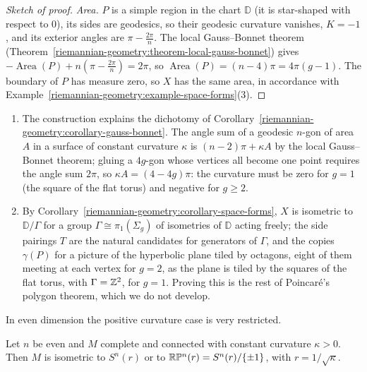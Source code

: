 \begin{proof}[Sketch of proof]
\emph{Area.} $P$ is a simple region in the chart $\mathbb{D}$ (it is star-shaped with respect to $0$), its sides are geodesics, so their geodesic curvature vanishes, $K = -1$, and its exterior angles are
$\pi - \frac{2\pi}{n}$. The local Gauss--Bonnet theorem (Theorem~\ref{riemannian-geometry:theorem-local-gauss-bonnet}) gives $-\operatorname{Area}(P) + n(\pi - \frac{2\pi}{n}) = 2\pi$, so
$\operatorname{Area}(P) = (n - 4)\pi = 4\pi(g - 1)$. The boundary of $P$ has measure zero, so $X$ has the same area, in accordance with Example~\ref{riemannian-geometry:example-space-forms}(3).
\end{proof}

\begin{remark}\label{riemannian-geometry:remark-hyperbolic-surfaces}
\begin{enumerate}
\item The construction explains the dichotomy of Corollary~\ref{riemannian-geometry:corollary-gauss-bonnet}. The angle sum of a geodesic $n$-gon of area $A$ in a surface of constant curvature $\kappa$ is
$(n - 2)\pi + \kappa A$ by the local Gauss--Bonnet theorem; gluing a $4g$-gon whose vertices all become one point requires the angle sum $2\pi$, so $\kappa A = (4 - 4g)\pi$: the curvature must be zero for $g = 1$
(the square of the flat torus) and negative for $g \geq 2$.
\item By Corollary~\ref{riemannian-geometry:corollary-space-forms}, $X$ is isometric to $\mathbb{D}/\Gamma$ for a group $\Gamma \cong \pi_1(\Sigma_g)$ of isometries of $\mathbb{D}$ acting freely;
the side pairings $T$ are the natural candidates for generators of $\Gamma$, and the copies $\gamma(P)$ for a picture of the hyperbolic plane tiled by octagons, eight of them meeting at each vertex
for $g = 2$, as the plane is tiled by the squares of the flat torus, with $\Gamma = \mathbb{Z}^2$, for $g = 1$. Proving this is the rest of Poincar\'e's polygon theorem, which we do not develop.
\end{enumerate}
\end{remark}

In even dimension the positive curvature case is very restricted.

\begin{corollary}\label{riemannian-geometry:corollary-even-spherical}
Let $n$ be even and $M$ complete and connected with constant curvature $\kappa > 0$. Then $M$ is isometric to $S^n(r)$ or to $\mathbb{R}\mathbb{P}^n(r) = S^n(r)/\{\pm1\}$, with
$r = 1/\sqrt\kappa$.
\end{corollary}

